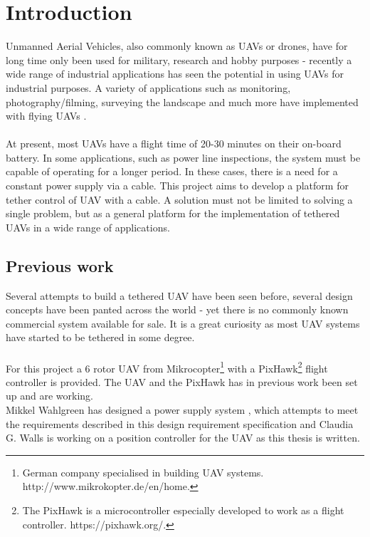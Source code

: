 \chapter{Introduction}

Unmanned Aerial Vehicles, also commonly known as UAVs or drones, have for long time only been used for military, research and hobby purposes - recently a wide range of industrial applications has seen the potential in using UAVs for industrial purposes.
A variety of applications such as monitoring, photography/filming, surveying the landscape and much more have implemented with flying UAVs \cite{Dandrone2015}.\\
\\
At present, most UAVs have a flight time of 20-30 minutes on their on-board battery.
In some applications, such as power line inspections, the system must be capable of operating for a longer period. In these cases, there is a need for a constant power supply via a cable. This project aims to develop a platform for tether control of UAV with a cable.
A solution must not be limited to solving a single problem, but as a general platform for the implementation of tethered UAVs in a wide range of applications.


\section{Previous work}
Several attempts to build a tethered UAV have been seen before, several design concepts have been panted across the world \cite{Peverill2013} - yet there is no commonly known commercial system available for sale. It is a great curiosity as most UAV systems have started to be tethered in some degree.\\
\\
For this project a 6 rotor UAV from Mikrocopter\footnote{German company specialised in building UAV systems. http://www.mikrokopter.de/en/home.} with a PixHawk\footnote{The PixHawk is a microcontroller especially developed to work as a flight controller. https://pixhawk.org/.} flight controller is provided. The UAV and the PixHawk has in previous work been set up and are working.\\
\noindent
Mikkel Wahlgreen has designed a power supply system \cite{Wahlgreen2014}, which attempts to meet the requirements described in this design requirement specification and Claudia G. Walls is working on a position controller for the UAV as this thesis is written.\\

